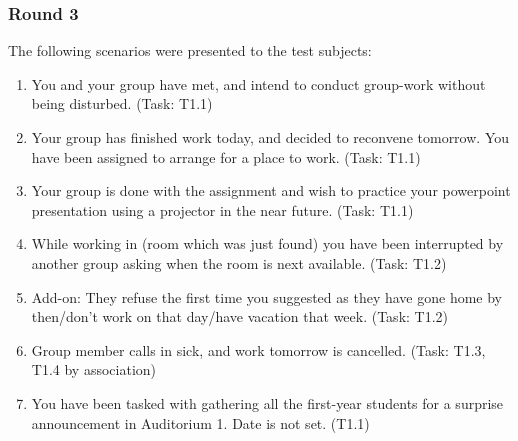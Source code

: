 \subsubsection{Round 3}
The following scenarios were presented to the test subjects:
\begin{enumerate}
\item You and your group have met, and intend to conduct group-work without being disturbed. (Task: T1.1)
\item Your group has finished work today, and decided to reconvene tomorrow. You have been assigned to arrange for a place to work. (Task: T1.1)
\item Your group is done with the assignment and wish to practice your powerpoint presentation using a projector in the near future. (Task: T1.1)
\item While working in (room which was just found) you have been interrupted by another group asking when the room is next available. (Task: T1.2)
\item Add-on: They refuse the first time you suggested as they have gone home by then/don't work on that day/have vacation that week. (Task: T1.2)
\item Group member calls in sick, and work tomorrow is cancelled. (Task: T1.3, T1.4 by association)
\item You have been tasked with gathering all the first-year students for a surprise announcement in Auditorium 1. Date is not set. (T1.1)
\end{enumerate}

